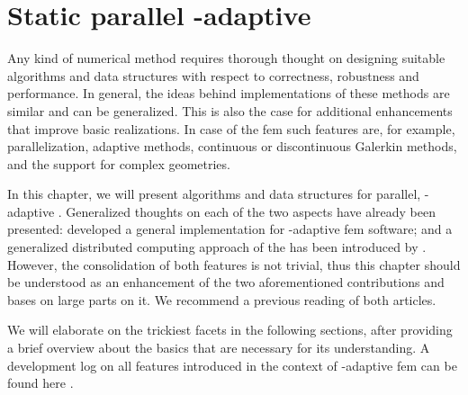 \chapter{Static parallel \hp-adaptive }
\label{ch:parallel}
\glsresetall

Any kind of numerical method requires thorough thought on designing suitable algorithms and data structures with respect to correctness, robustness and performance. In general, the ideas behind implementations of these methods are similar and can be generalized.
This is also the case for additional enhancements that improve basic realizations. In case of the \gls{fem} such features are, for example, parallelization, adaptive methods, continuous or discontinuous Galerkin methods, and the support for complex geometries.

In this chapter, we will present algorithms and data structures for parallel, \hp-adaptive . Generalized thoughts on each of the two aspects have already been presented: \textcite{bangerth2009} developed a general implementation for \hp-adaptive \gls{fem} software; and a generalized distributed computing approach of the  has been introduced by \textcite{bangerth2012}. However, the consolidation of both features is not trivial, thus this chapter should be understood as an enhancement of the two aforementioned contributions and bases on large parts on it. We recommend a previous reading of both articles.

We will elaborate on the trickiest facets in the following sections, after providing a brief overview about the basics that are necessary for its understanding. A development log on all features introduced in the context of \hp-adaptive \gls{fem} can be found here \textcite{dealiiissue3511}.



\setcounter{section}{-1}


